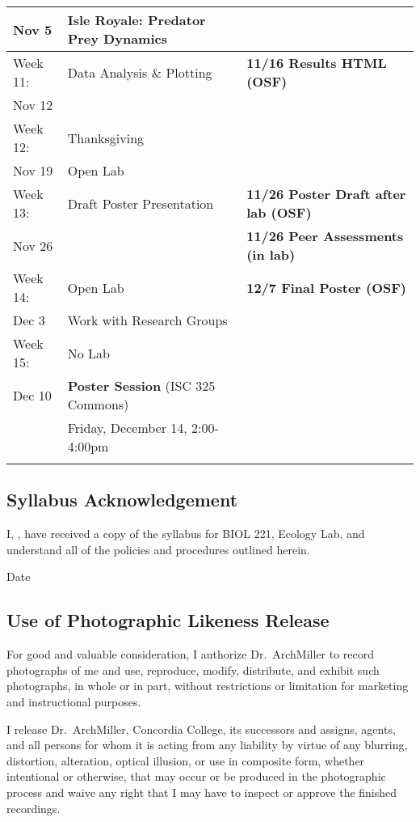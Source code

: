 \documentclass{tufte-handout}
\begin{document}
\begin{tabular}{l l l}
Nov 5 & Isle Royale: Predator Prey Dynamics & \\
\hline
Week 11: & Data Analysis \& Plotting & \textbf{11/16 Results HTML (OSF)} \\
Nov 12 \\
\hline
Week 12: & Thanksgiving \\
Nov 19 & Open Lab \\
\hline
Week 13: & Draft Poster Presentation & \textbf{11/26 Poster Draft after lab (OSF)}\\
Nov 26 &  & \textbf{11/26 Peer Assessments (in lab)}\\
\hline
Week 14: & Open Lab &  \textbf{12/7 Final Poster (OSF)} \\
Dec 3 & Work with Research Groups &\\
\hline 
Week 15: & No Lab & \\
Dec 10 & \textbf{Poster Session} (ISC 325 Commons) &  \\
 & Friday, December 14, 2:00-4:00pm \\
\hline
\\
\end{tabular}



\newpage

\subsection{Syllabus Acknowledgement}

I, \underline{\hspace{5cm}}, have received a copy of the syllabus for BIOL 221, Ecology Lab, and understand all of the policies and procedures outlined herein. 

  \underline{\hspace{5cm}} {Date}  \hrulefill


\subsection{Use of Photographic Likeness Release}

For good and valuable consideration, I authorize Dr.~ArchMiller to record photographs of me and use, reproduce, modify, distribute, and exhibit such photographs, in whole or in part, without restrictions or limitation for marketing and instructional purposes. 

I release Dr.~ArchMiller, Concordia College, its successors and assigns, agents, and all persons for whom it is acting from any liability by virtue of any blurring, distortion, alteration, optical illusion, or use in composite form, whether intentional or otherwise, that may occur or be produced in the photographic process and waive any right that I may have to inspect or approve the finished recordings.
\end{document}
